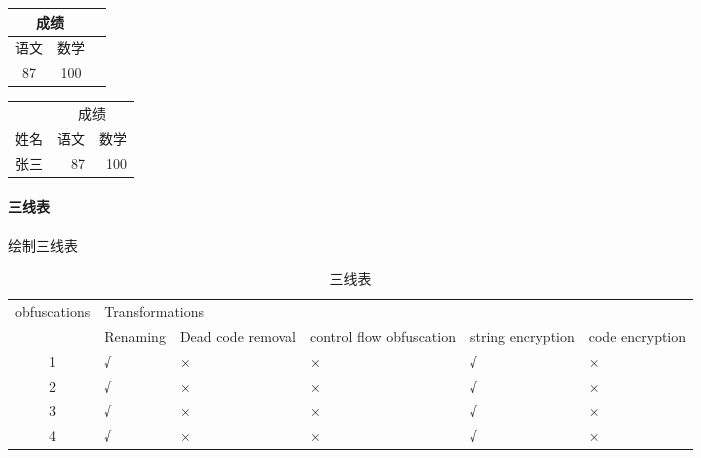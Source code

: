 \documentclass{article}
\begin{document}
\begin{center}
    \begin{tabular}{|c|c|c|}
    \hline
    \multicolumn{2}{|c|}{成绩}  \\    %
    \hline
    语文  &   数学  \\   
    \hline    
    87    & 100  \\
    \hline  
    \end{tabular}

    \begin{tabular}{|c|r|r|}
        \hline
        & \multicolumn{2}{|c|}{成绩}   \\ \cline{2-3}
        姓名   & 语文 & 数学 \\ 
        \hline
        张三   & 87 & 100 \\
        \hline
    \end{tabular}
\end{center}

\paragraph{三线表} 绘制三线表

    \begin{table}[h]   %
    \centering
    \caption{三线表}
    \begin{tabular}{clllll}
     \toprule
     \multirow{2}{*}{obfuscations} & \multicolumn{5}{l}{Transformations}   \\
     \cline{2-6}    %
     & Renaming & Dead code removal & control flow obfuscation & string encryption & code encryption \\
     \midrule
     1 & √ & ×  & × & √  & × \\
     2 & √ & ×  & × & √  & × \\
     3 & √ & ×  & × & √  & × \\
     4 & √ & ×  & × & √  & × \\
     \bottomrule
    \end{tabular}
    \end{table}
\end{document}

